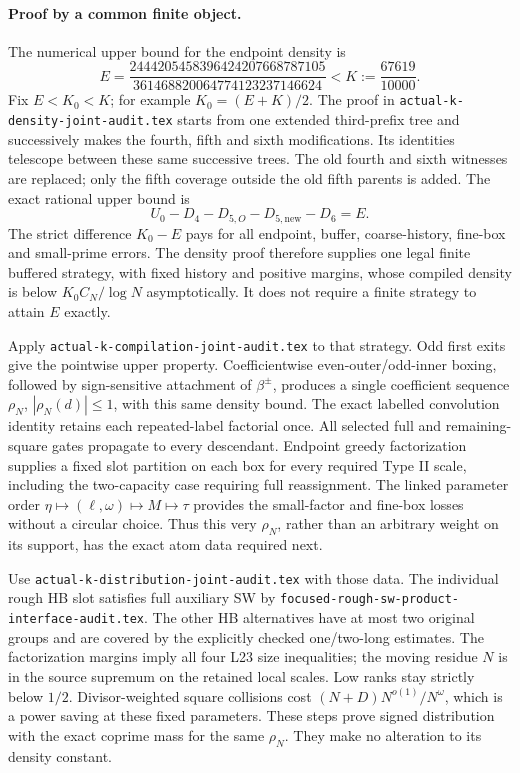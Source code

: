 \paragraph{Proof by a common finite object.}
The numerical upper bound for the endpoint density is
\[
 E=\frac{2444205458396424207668787105}
         {361468820064774123237146624}
 < K:=\frac{67619}{10000}.
\]
Fix $E<K_0<K$; for example $K_0=(E+K)/2$.
The proof in \texttt{actual-k-density-joint-audit.tex} starts from
one extended third-prefix tree and successively makes the fourth,
fifth and sixth modifications. Its identities telescope between
these same successive trees. The old fourth and sixth witnesses
are replaced; only the fifth coverage outside the old fifth
parents is added. The exact rational upper bound is
\[
 U_0-D_4-D_{5,O}-D_{5,\mathrm{new}}-D_6=E.
\]
The strict difference $K_0-E$ pays for all endpoint, buffer,
coarse-history, fine-box and small-prime errors. The density proof
therefore supplies one legal finite buffered strategy, with fixed
history and positive margins, whose compiled density is below
$K_0 C_N/\log N$ asymptotically. It does not require a finite
strategy to attain $E$ exactly.

Apply \texttt{actual-k-compilation-joint-audit.tex} to that strategy.
Odd first exits give the pointwise upper property. Coefficientwise
even-outer/odd-inner boxing, followed by sign-sensitive attachment
of $\beta^\pm$, produces a single coefficient sequence $\rho_N$,
$|\rho_N(d)|\le1$, with this same density bound. The exact labelled
convolution identity retains each repeated-label factorial once.
All selected full and remaining-square gates propagate to every
descendant. Endpoint greedy factorization supplies a fixed slot
partition on each box for every required Type II scale, including
the two-capacity case requiring full reassignment. The linked
parameter order $\eta\mapsto(\ell,\omega)\mapsto M\mapsto\tau$
provides the small-factor and fine-box losses without a circular
choice. Thus this very $\rho_N$, rather than an arbitrary weight
on its support, has the exact atom data required next.

Use \texttt{actual-k-distribution-joint-audit.tex} with those data.
The individual rough HB slot satisfies full auxiliary SW by
\texttt{focused-rough-sw-product-interface-audit.tex}.
The other HB alternatives have at most two original groups and
are covered by the explicitly checked one/two-long estimates.
The factorization margins imply all four L23 size inequalities;
the moving residue $N$ is in the source supremum on the retained
local scales. Low ranks stay strictly below $1/2$. Divisor-weighted
square collisions cost $(N+D)N^{o(1)}/N^\omega$, which is a power
saving at these fixed parameters. These steps prove signed
distribution with the exact coprime mass for the same $\rho_N$.
They make no alteration to its density constant.

